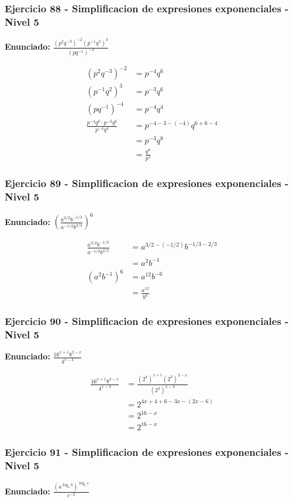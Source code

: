 \documentclass[12pt,a4paper]{article}
\begin{document}
\subsubsection*{Ejercicio 88 - Simplificacion de expresiones exponenciales - Nivel 5}
\textbf{Enunciado:} \(\frac{(p^2q^{-3})^{-2}(p^{-1}q^2)^3}{(pq^{-1})^{-4}}\)

\[
\begin{aligned}
(p^2q^{-3})^{-2}&=p^{-4}q^6\\
(p^{-1}q^2)^3&=p^{-3}q^6\\
(pq^{-1})^{-4}&=p^{-4}q^4\\
\frac{p^{-4}q^6\cdot p^{-3}q^6}{p^{-4}q^4}&=p^{-4-3-(-4)}q^{6+6-4}\\
&=p^{-3}q^8\\
&=\boxed{\frac{q^8}{p^3}}
\end{aligned}
\]


\subsubsection*{Ejercicio 89 - Simplificacion de expresiones exponenciales - Nivel 5}
\textbf{Enunciado:} \(\left(\frac{a^{3/2}b^{-1/3}}{a^{-1/2}b^{2/3}}\right)^6\)

\[
\begin{aligned}
\frac{a^{3/2}b^{-1/3}}{a^{-1/2}b^{2/3}}&=a^{3/2-(-1/2)}b^{-1/3-2/3}\\
&=a^2b^{-1}\\
\left(a^2b^{-1}\right)^6&=a^{12}b^{-6}\\
&=\boxed{\frac{a^{12}}{b^6}}
\end{aligned}
\]


\subsubsection*{Ejercicio 90 - Simplificacion de expresiones exponenciales - Nivel 5}
\textbf{Enunciado:} \(\frac{16^{x+1}8^{2-x}}{4^{x-3}}\)

\[
\begin{aligned}
\frac{16^{x+1}8^{2-x}}{4^{x-3}}&=\frac{(2^4)^{x+1}(2^3)^{2-x}}{(2^2)^{x-3}}\\
&=2^{4x+4+6-3x-(2x-6)}\\
&=2^{16-x}\\
&=\boxed{2^{16-x}}
\end{aligned}
\]


\subsubsection*{Ejercicio 91 - Simplificacion de expresiones exponenciales - Nivel 5}
\textbf{Enunciado:} \(\frac{(a^{\log_a b})^{\log_b c}}{c^{-2}}\)
\end{document}
